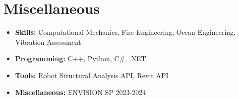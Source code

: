 \documentclass[12pt]{article}
\begin{document}
\printbibliography[heading={bibintoc}, title={Participation in R+D+i projects}, type=project]


\section{Miscellaneous}
\begin{itemize}
    \itemsep=-.3em
    \item \textbf{Skills:} Computational Mechanics, Fire Engineering, Ocean Engineering, Vibration Assessment
    \item \textbf{Programming:} C++, Python, C\#, .NET
    \item \textbf{Tools:} Robot Structural Analysis API, Revit API
    \item \textbf{Miscellaneous:} ENVISION SP 2023-2024
\end{itemize}
\end{document}
